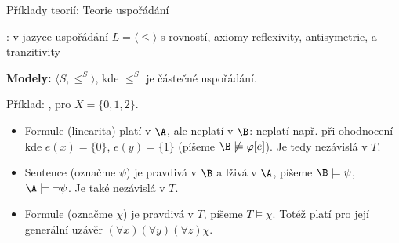 \documentclass{beamer}
\begin{document}
\begin{frame}{Příklady teorií: Teorie uspořádání}

    \pause
    : v jazyce uspořádání $L=\langle\leq\rangle$ s rovností, axiomy \alert{reflexivity}, \alert{antisymetrie}, a \alert{tranzitivity}

    \pause

    \pause
    \textbf{Modely:} $\langle S,\leq^S\rangle$, kde $\leq^S$ je \alert{částečné uspořádání}. 
    
    \pause
    Příklad: ,  pro $X=\{0,1,2\}$.\pause
    \begin{itemize}
        \item Formule  (\alert{linearita}) platí v $\A$, ale neplatí v $\B$: neplatí např. při ohodnocení kde $e(x)=\{0\}$, $e(y)=\{1\}$ (píšeme $\B\not\models\varphi[e]$). Je tedy nezávislá v $T$.\pause
        \item Sentence  (označme $\psi$) je pravdivá v $\B$ a lživá v $\A$, píšeme $\B\models\psi$, $\A\models\neg\psi$. Je také nezávislá v $T$.\pause
        \item Formule  (označme  $\chi$) je pravdivá v $T$, píšeme $T\models\chi$. \pause 
         Totéž platí pro její \alert{generální uzávěr} $(\forall x)(\forall y)(\forall z)\chi$.
    \end{itemize}

\end{frame}
\end{document}
